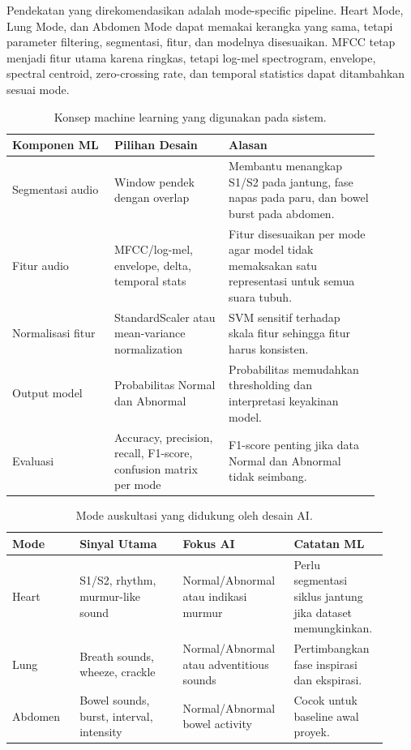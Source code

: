 \documentclass[12pt,a4paper]{article}
\begin{document}
Pendekatan yang direkomendasikan adalah mode-specific pipeline. Heart Mode, Lung Mode, dan Abdomen Mode dapat memakai kerangka yang sama, tetapi parameter filtering, segmentasi, fitur, dan modelnya disesuaikan. MFCC tetap menjadi fitur utama karena ringkas, tetapi log-mel spectrogram, envelope, spectral centroid, zero-crossing rate, dan temporal statistics dapat ditambahkan sesuai mode.

\begin{table}[H]
\centering
\begin{tabular}{p{0.25\linewidth}p{0.28\linewidth}p{0.37\linewidth}}
\toprule
\textbf{Komponen ML} & \textbf{Pilihan Desain} & \textbf{Alasan} \\
\midrule
Segmentasi audio & Window pendek dengan overlap & Membantu menangkap S1/S2 pada jantung, fase napas pada paru, dan bowel burst pada abdomen. \\
Fitur audio & MFCC/log-mel, envelope, delta, temporal stats & Fitur disesuaikan per mode agar model tidak memaksakan satu representasi untuk semua suara tubuh. \\
Normalisasi fitur & StandardScaler atau mean-variance normalization & SVM sensitif terhadap skala fitur sehingga fitur harus konsisten. \\
Output model & Probabilitas Normal dan Abnormal & Probabilitas memudahkan thresholding dan interpretasi keyakinan model. \\
Evaluasi & Accuracy, precision, recall, F1-score, confusion matrix per mode & F1-score penting jika data Normal dan Abnormal tidak seimbang. \\
\bottomrule
\end{tabular}
\caption{Konsep machine learning yang digunakan pada sistem.}
\end{table}

\begin{table}[H]
\centering
\begin{tabular}{p{0.17\linewidth}p{0.26\linewidth}p{0.28\linewidth}p{0.21\linewidth}}
\toprule
\textbf{Mode} & \textbf{Sinyal Utama} & \textbf{Fokus AI} & \textbf{Catatan ML} \\
\midrule
Heart & S1/S2, rhythm, murmur-like sound & Normal/Abnormal atau indikasi murmur & Perlu segmentasi siklus jantung jika dataset memungkinkan. \\
Lung & Breath sounds, wheeze, crackle & Normal/Abnormal atau adventitious sounds & Pertimbangkan fase inspirasi dan ekspirasi. \\
Abdomen & Bowel sounds, burst, interval, intensity & Normal/Abnormal bowel activity & Cocok untuk baseline awal proyek. \\
\bottomrule
\end{tabular}
\caption{Mode auskultasi yang didukung oleh desain AI.}
\end{table}
\end{document}
